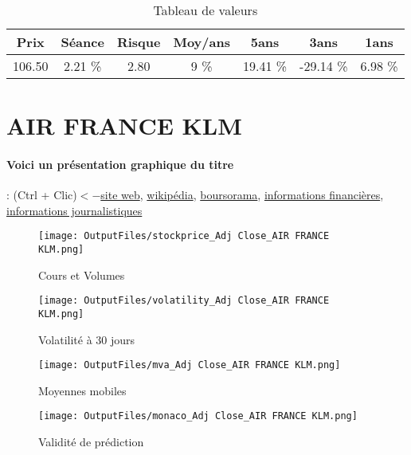 \documentclass[11pt,a4paper]{report}%
\begin{document}
\begin{table}[H]
  \centering
    \begin{tabular}{|c|c|c|c|c|c|c|}
    \hline
    Prix & Séance & Risque  & Moy/ans & 5ans & 3ans & 1ans \\
    \hline
    106.50 &    2.21 \%    & 2.80 & 9 \% & 19.41 \% & -29.14 \% & 6.98 \% \\
    \hline
    \end{tabular}%
        \label{tab:table_AEROPORTS PARIS}%
      \caption{Tableau de valeurs}
\end{table}%

\newpage

\section{AIR FRANCE KLM}

\paragraph{Voici un présentation graphique du titre} : (Ctrl + Clic)$<-$\href{https://www.airfranceklm.com/fr/finance}{site web}, \href{https://fr.wikipedia.org/wiki/Air_France-KLM}{wikipédia}, \href{https://www.boursorama.com/cours/1rPAF}{boursorama}, \href{https://www.qwant.com/?q=site:https:%2f%2fwww.easybourse.com%2faction-societe%2fAIR-FRANCE-KLM&t=web&client=ext-firefox-hp}{informations financières}, \href{https://bourse.lerevenu.com/cours-de-bourse/fiche-valeur-synthese/AIR-FRANCE-KLM/AF-FR}{informations journalistiques}
\begin{figure}[!htb]
   \begin{minipage}{0.5\textwidth}
     \centering
     \texttt{[image: OutputFiles/stockprice\_Adj Close\_AIR FRANCE KLM.png]}
     \caption{Cours et Volumes}\label{Fig:price_AIR FRANCE KLM}
   \end{minipage}\hfill
   \begin{minipage}{0.5\textwidth}
     \centering
     \texttt{[image: OutputFiles/volatility\_Adj Close\_AIR FRANCE KLM.png]}
     \caption{Volatilité à 30 jours}\label{Fig:volat_AIR FRANCE KLM}
   \end{minipage}
\end{figure}
\begin{figure}[!htb]
   \begin{minipage}{0.5\textwidth}
     \centering
     \texttt{[image: OutputFiles/mva\_Adj Close\_AIR FRANCE KLM.png]}
     \caption{Moyennes mobiles}\label{Fig:mva_AIR FRANCE KLM}
   \end{minipage}\hfill
   \begin{minipage}{0.5\textwidth}
     \centering
     \texttt{[image: OutputFiles/monaco\_Adj Close\_AIR FRANCE KLM.png]}
     \caption{Validité de prédiction}\label{Fig:prediction_AIR FRANCE KLM}
   \end{minipage}
\end{figure}
\end{document}
